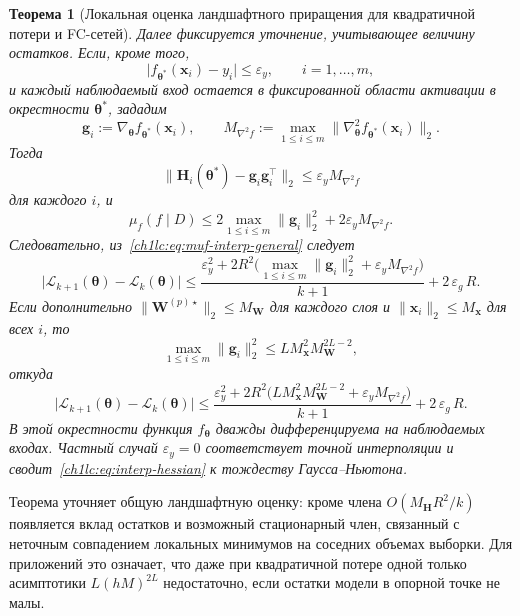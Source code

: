 \documentclass{dissert}
\newtheorem{theorem}{Теорема}
\begin{document}
\begin{theorem}[Локальная оценка ландшафтного приращения для квадратичной потери и FC-сетей]
Далее фиксируется уточнение, учитывающее величину остатков.
Если, кроме того,
\[
  \bigl|f_{\boldsymbol{\theta}^*}(\mathbf{x}_i)-y_i\bigr|\le \varepsilon_y,
  \qquad i=1,\dots,m,
\]
и каждый наблюдаемый вход остается в фиксированной области активации в окрестности $\boldsymbol{\theta}^*$, зададим
\[
  \mathbf{g}_i:=\nabla_{\boldsymbol{\theta}}f_{\boldsymbol{\theta}^*}(\mathbf{x}_i),
  \qquad
  M_{\nabla^2 f}:=
  \max_{1\le i\le m}\bigl\|\nabla_{\boldsymbol{\theta}}^2 f_{\boldsymbol{\theta}^*}(\mathbf{x}_i)\bigr\|_2 .
\]
Тогда
\begin{equation}\label{ch1lc:eq:interp-hessian}
  \bigl\|
    \mathbf{H}_i(\boldsymbol{\theta}^*)
    - \mathbf{g}_i\mathbf{g}_i^\top
  \bigr\|_2
  \le \varepsilon_y M_{\nabla^2 f}
\end{equation}
для каждого $i$, и
\begin{equation}\label{ch1lc:eq:muf-interp-general}
  \mu_f(f\mid D)\le
  2\max_{1\le i\le m}\|\mathbf{g}_i\|_2^2
  + 2\varepsilon_y M_{\nabla^2 f} .
\end{equation}
Следовательно, из~\eqref{ch1lc:eq:muf-interp-general} следует
\begin{equation}
  \bigl|\mathcal{L}_{k+1}(\boldsymbol{\theta}) - \mathcal{L}_k(\boldsymbol{\theta})\bigr|
  \le
  \frac{\varepsilon_y^2 + 2R^2\bigl(\max_{1\le i\le m}\|\mathbf{g}_i\|_2^2 + \varepsilon_y M_{\nabla^2 f}\bigr)}{k+1}
  + 2\,\varepsilon_g\,R .
\end{equation}
Если дополнительно $\|\mathbf{W}^{(p)\star}\|_2\le M_{\mathbf{W}}$ для каждого слоя и $\|\mathbf{x}_i\|_2\le M_{\mathbf{x}}$ для всех $i$, то
\begin{equation}
  \max_{1\le i\le m}\|\mathbf{g}_i\|_2^2
  \le L M_{\mathbf{x}}^2 M_{\mathbf{W}}^{2L-2},
\end{equation}
откуда
\begin{equation}
  \bigl|\mathcal{L}_{k+1}(\boldsymbol{\theta}) - \mathcal{L}_k(\boldsymbol{\theta})\bigr|
  \le
  \frac{\varepsilon_y^2 + 2R^2\bigl(L M_{\mathbf{x}}^2 M_{\mathbf{W}}^{2L-2} + \varepsilon_y M_{\nabla^2 f}\bigr)}{k+1}
  + 2\,\varepsilon_g\,R .
\end{equation}
В этой окрестности функция $f_{\boldsymbol{\theta}}$ дважды дифференцируема на наблюдаемых входах. Частный случай $\varepsilon_y=0$ соответствует точной интерполяции и сводит~\eqref{ch1lc:eq:interp-hessian} к тождеству Гаусса--Ньютона.
\end{theorem}
Теорема уточняет общую ландшафтную оценку: кроме члена $O(M_{\mathbf{H}}R^2/k)$ появляется вклад остатков и возможный стационарный член, связанный с неточным совпадением локальных минимумов на соседних объемах выборки.
Для приложений это означает, что даже при квадратичной потере одной только асимптотики $L(hM)^{2L}$ недостаточно, если остатки модели в опорной точке не малы.
\end{document}
